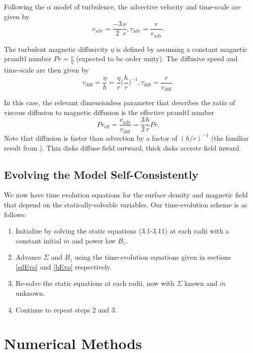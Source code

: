 Following the $\alpha$ model of turbulence, the advective velocity and time-scale are given by 
\begin{equation}
v_{\text{adv}}=\frac{-3}{2} \frac{\nu}{r}, \tau_{\text{adv}}=\frac{r}{v_{\text{adv}}}. 
\end{equation}
 
The turbulent magnetic diffusivity $\eta$ is defined by assuming a constant magnetic prandtl number $Pr=\frac{\nu}{\eta}$ (expected to be order unity).  The diffusive speed and time-scale are then given by   
\begin{equation}
v_{\text{diff}}=\frac{\eta}{h} = \frac{\eta}{r} \Big(\frac{h}{r}\Big)^{-1}, \tau_{\text{diff}}=\frac{r}{v_{\text{diff}}}. 
\end{equation}

In this case, the relevant dimensionless parameter that describes the ratio of viscous diffusion to magnetic diffusion is the effective prandtl number 
\begin{equation}
Pr_{\text{eff}} = \frac{v_{\text{adv}}}{v_{\text{diff}}} = \frac{3}{2} \frac{h}{r}Pr.
\end{equation} 
Note that diffusion is faster than advection by a factor of $(h/r)^{-1}$ (the familiar result from \cite{lubow93}).  Thin disks diffuse field outward, thick disks accrete field inward.


\subsection{Evolving the Model Self-Consistently}
We now have time evolution equations for the surface density and magnetic field that depend on the statically-solvable variables. 
Our time-evolution scheme is as follows:
\begin{enumerate}
\item{Initialize by solving the static equations (3.1-3.11) at each radii with a constant initial $\dot{m}$ and power law $B_z$.  }
\item{Advance $\Sigma$ and $B_z$ using the time-evolution equations given in sections \ref{sdEvo} and \ref{bEvo} respectively. }
\item{Re-solve the static equations at each radii, now with $\Sigma$ known and $\dot{m}$ unknown.}
\item{Continue to repeat steps 2 and 3.}
\end{enumerate}




\newpage
\section{Numerical Methods}
